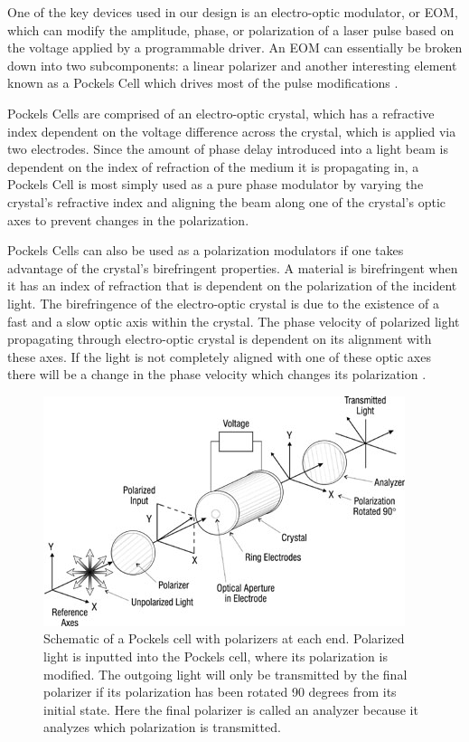 \documentclass[pdftex,12pt,a4paper]{article}
\begin{document}
One of the key devices used in our design is an electro-optic modulator, or EOM, which can modify the amplitude, phase, or polarization of a laser pulse based on the voltage applied by a programmable driver. An EOM can essentially be broken down into two subcomponents: a linear polarizer and another interesting element known as a Pockels Cell which drives most of the pulse modifications \cite{RP_EOM}.

Pockels Cells are comprised of an electro-optic crystal, which has a refractive index dependent on the voltage difference across the crystal, which is applied via two electrodes. Since the amount of phase delay introduced into a light beam is dependent on the index of refraction of the medium it is propagating in, a Pockels Cell is most simply used as a pure phase modulator by varying the crystal's refractive index and aligning the beam along one of the crystal's optic axes to prevent changes in the polarization\cite{RP_Pockels_Cell}.      

Pockels Cells can also be used as a polarization modulators if one takes advantage of the crystal's birefringent properties. A material is birefringent when it has an index of refraction that is dependent on the polarization of the incident light. The birefringence of the electro-optic crystal is due to the existence of a fast and a slow optic axis within the crystal. The phase velocity of polarized light propagating through electro-optic crystal is dependent on its alignment with these axes. If the light is not completely aligned with one of these optic axes there will be a change in the phase velocity which changes its polarization \cite{RP_Birefringence}.

\begin{figure}[]
  \centering
    \includegraphics[scale=2.75]{PCschematic}
  \caption{Schematic of a Pockels cell with polarizers at each end. Polarized light is inputted into the Pockels cell, where its polarization is modified. The outgoing light will only be transmitted by the final polarizer if its polarization has been rotated 90 degrees from its initial state. Here the final polarizer is called an analyzer because it analyzes which polarization is transmitted\cite{simcik_module}.}
  \label{fig:PCschematic}
\end{figure}
\end{document}
